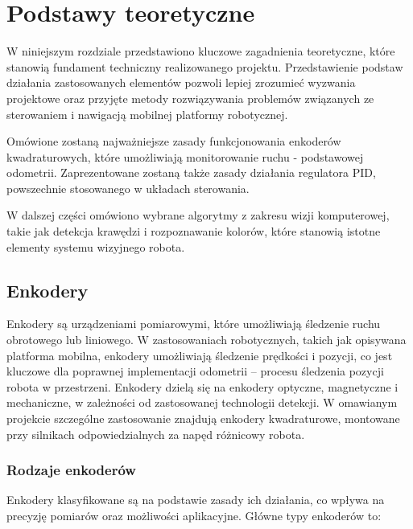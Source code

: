\chapter{Podstawy teoretyczne}
\label{ch:podstawy-teoretyczne}


W niniejszym rozdziale przedstawiono kluczowe zagadnienia teoretyczne, które stanowią fundament techniczny realizowanego projektu. Przedstawienie podstaw działania zastosowanych elementów pozwoli lepiej zrozumieć wyzwania projektowe oraz przyjęte metody rozwiązywania problemów związanych ze sterowaniem i nawigacją mobilnej platformy robotycznej.

Omówione zostaną najważniejsze zasady funkcjonowania enkoderów kwadraturowych, które umożliwiają monitorowanie ruchu - podstawowej odometrii. Zaprezentowane zostaną także zasady działania regulatora PID, powszechnie stosowanego w układach sterowania.

W dalszej części omówiono wybrane algorytmy z zakresu wizji komputerowej, takie jak detekcja krawędzi i rozpoznawanie kolorów, które stanowią istotne elementy systemu wizyjnego robota.

\section{Enkodery}

Enkodery są urządzeniami pomiarowymi, które umożliwiają śledzenie ruchu obrotowego lub liniowego. W zastosowaniach robotycznych, takich jak opisywana platforma mobilna, enkodery umożliwiają śledzenie prędkości i pozycji, co jest kluczowe dla poprawnej implementacji odometrii – procesu śledzenia pozycji robota w przestrzeni. Enkodery dzielą się na enkodery optyczne, magnetyczne i mechaniczne, w zależności od zastosowanej technologii detekcji. W omawianym projekcie szczególne zastosowanie znajdują enkodery kwadraturowe, montowane przy silnikach odpowiedzialnych za napęd różnicowy robota.

\subsection{Rodzaje enkoderów}

Enkodery klasyfikowane są na podstawie zasady ich działania, co wpływa na precyzję pomiarów oraz możliwości aplikacyjne. Główne typy enkoderów to:

